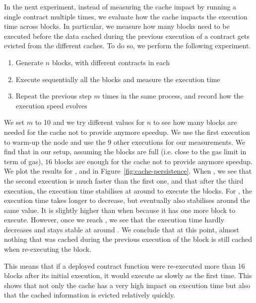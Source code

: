 %
 In the next experiment, instead of measuring the cache impact by running a single contract multiple times, we evaluate how the cache impacts the execution time across blocks. In particular, we measure how many blocks need to be executed before the data cached during the previous execution of a contract gets evicted from the different caches. To do so, we perform the following experiment.

\begin{enumerate}
\item Generate $n$ blocks, with different contracts in each
\item Execute sequentially all the blocks and measure the execution time
\item Repeat the previous step $m$ times in the same process, and record how the execution speed evolves
\end{enumerate}

We set $m$ to 10 and we try different values for $n$ to see how many blocks are needed for the cache not to provide anymore speedup. We use the first execution to warm-up the node and use the $9$ other executions for our measurements. We find that in our setup, assuming the blocks are full (i.e. close to the gas limit in term of gas), $16$ blocks are enough for the cache not to provide anymore speedup. We plot the results for ,  and  in Figure~\ref{fig:cache-persistence}. When , we see that the second execution is much faster than the first one, and that after the third execution, the execution time stabilises at around  to execute the  blocks. For , the execution time takes longer to decrease, but eventually also stabilises around the same value. It is slightly higher than when  because it has one more block to execute. However, once we reach , we see that the execution time hardly decreases and stays stable at around . We conclude that at this point, almost nothing that was cached during the previous execution of the block is still cached when re-executing the block.

This means that if a deployed contract function were re-executed more than 16 blocks after its initial execution, it would execute as slowly as the first time.
This shows that not only the cache has a very high impact on execution time but also that the cached information is evicted relatively quickly.

